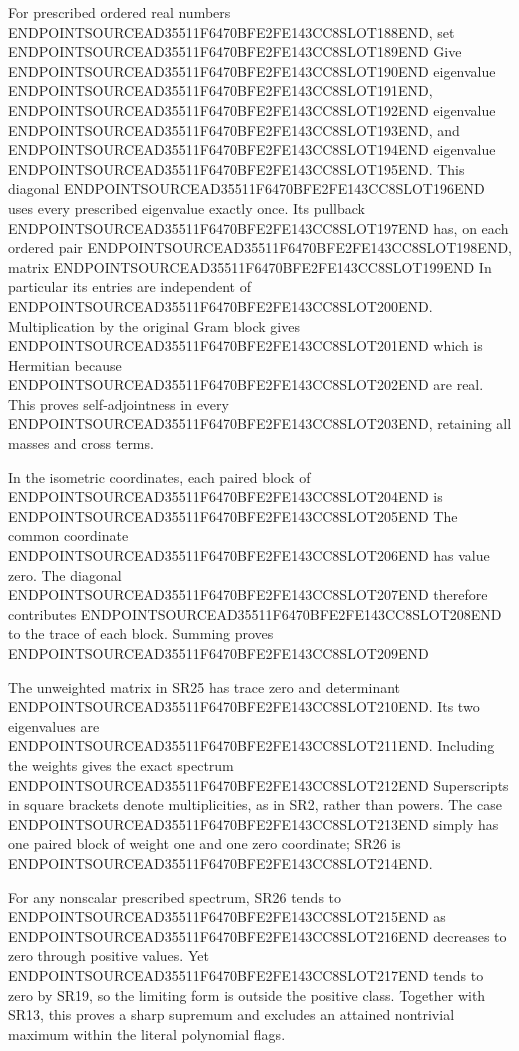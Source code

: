 For prescribed ordered real numbers ENDPOINTSOURCEAD35511F6470BFE2FE143CC8SLOT188END, set ENDPOINTSOURCEAD35511F6470BFE2FE143CC8SLOT189END Give ENDPOINTSOURCEAD35511F6470BFE2FE143CC8SLOT190END eigenvalue ENDPOINTSOURCEAD35511F6470BFE2FE143CC8SLOT191END, ENDPOINTSOURCEAD35511F6470BFE2FE143CC8SLOT192END eigenvalue ENDPOINTSOURCEAD35511F6470BFE2FE143CC8SLOT193END, and ENDPOINTSOURCEAD35511F6470BFE2FE143CC8SLOT194END eigenvalue ENDPOINTSOURCEAD35511F6470BFE2FE143CC8SLOT195END. This diagonal ENDPOINTSOURCEAD35511F6470BFE2FE143CC8SLOT196END uses every prescribed eigenvalue exactly once. Its pullback ENDPOINTSOURCEAD35511F6470BFE2FE143CC8SLOT197END has, on each ordered pair ENDPOINTSOURCEAD35511F6470BFE2FE143CC8SLOT198END, matrix ENDPOINTSOURCEAD35511F6470BFE2FE143CC8SLOT199END In particular its entries are independent of ENDPOINTSOURCEAD35511F6470BFE2FE143CC8SLOT200END. Multiplication by the original Gram block gives ENDPOINTSOURCEAD35511F6470BFE2FE143CC8SLOT201END which is Hermitian because ENDPOINTSOURCEAD35511F6470BFE2FE143CC8SLOT202END are real. This proves self-adjointness in every ENDPOINTSOURCEAD35511F6470BFE2FE143CC8SLOT203END, retaining all masses and cross terms.

In the isometric coordinates, each paired block of ENDPOINTSOURCEAD35511F6470BFE2FE143CC8SLOT204END is ENDPOINTSOURCEAD35511F6470BFE2FE143CC8SLOT205END The common coordinate ENDPOINTSOURCEAD35511F6470BFE2FE143CC8SLOT206END has value zero. The diagonal ENDPOINTSOURCEAD35511F6470BFE2FE143CC8SLOT207END therefore contributes ENDPOINTSOURCEAD35511F6470BFE2FE143CC8SLOT208END to the trace of each block. Summing proves ENDPOINTSOURCEAD35511F6470BFE2FE143CC8SLOT209END

The unweighted matrix in SR25 has trace zero and determinant ENDPOINTSOURCEAD35511F6470BFE2FE143CC8SLOT210END. Its two eigenvalues are ENDPOINTSOURCEAD35511F6470BFE2FE143CC8SLOT211END. Including the weights gives the exact spectrum ENDPOINTSOURCEAD35511F6470BFE2FE143CC8SLOT212END Superscripts in square brackets denote multiplicities, as in SR2, rather than powers. The case ENDPOINTSOURCEAD35511F6470BFE2FE143CC8SLOT213END simply has one paired block of weight one and one zero coordinate; SR26 is ENDPOINTSOURCEAD35511F6470BFE2FE143CC8SLOT214END.

For any nonscalar prescribed spectrum, SR26 tends to ENDPOINTSOURCEAD35511F6470BFE2FE143CC8SLOT215END as ENDPOINTSOURCEAD35511F6470BFE2FE143CC8SLOT216END decreases to zero through positive values. Yet ENDPOINTSOURCEAD35511F6470BFE2FE143CC8SLOT217END tends to zero by SR19, so the limiting form is outside the positive class. Together with SR13, this proves a sharp supremum and excludes an attained nontrivial maximum within the literal polynomial flags.

